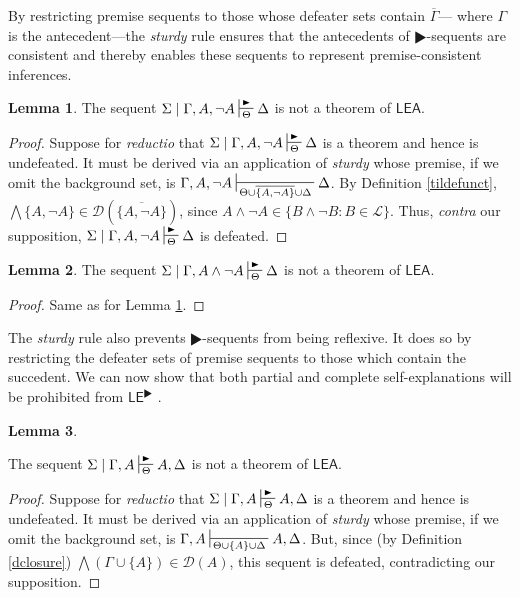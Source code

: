 \documentclass{article}
\theoremstyle{definition}
\theoremstyle{definition}
\theoremstyle{definition}
\newtheorem{lemma}{Lemma}
\theoremstyle{definition}
\theoremstyle{remark}
\theoremstyle{definition}
\theoremstyle{definition}
\begin{document}
By restricting premise sequents to those whose defeater sets contain $ \overline{\Gamma} $--- where $ \Gamma $ is the antecedent---the \textit{sturdy} rule ensures that the antecedents of $ \RHD $-sequents are consistent and thereby enables these sequents to represent premise-consistent inferences.

\begin{lemma}\label{inconsist}
	The sequent $ \Sigma\mid \Gamma, A, \neg A \sststile{\Theta}{\RHD}  \Delta $ is not a theorem of $ \mathsf{LEA}$.
	
	\begin{proof}
		Suppose for \textit{reductio} that $ \Sigma\mid \Gamma, A, \neg A \sststile{\Theta}{\RHD} \Delta $ is a theorem and hence is undefeated. It must be derived via an application of \textit{sturdy} whose premise, if we omit the background set, is $\Gamma, A, \neg A \sststile{\Theta\cup\overline{\{A, \neg A\}}\cup\Delta}{} \Delta $. By Definition \ref{tildefunct}, $\bigwedge\{A, \neg A \}\in \mathcal{D}(\overline{\{A, \neg A\}})$, since $ A \wedge \neg A \in  \{ B\wedge\neg B : B \in \mathcal{L} \}$. Thus, \textit{contra} our supposition,  $ \Sigma\mid \Gamma, A, \neg A \sststile{\Theta}{\RHD} \Delta $ is defeated.
	\end{proof}
\end{lemma}



\begin{lemma}\label{contradict}
	The sequent $ \Sigma\mid \Gamma, A \wedge \neg A \sststile{\Theta}{\RHD}  \Delta $ is not a theorem of $ \mathsf{LEA}$.
	
	\begin{proof} 
		Same as for Lemma \ref{inconsist}.
	\end{proof}
	
\end{lemma}




The \textit{sturdy} rule also prevents $ \RHD $-sequents from being reflexive. It does so by restricting the defeater sets of premise sequents to those which contain the succedent. We can now show that both partial and complete self-explanations will be prohibited from $ \mathsf{LE}^\RHD$ .

\begin{lemma}\label{irrefl}
	
	The sequent $ \Sigma\mid \Gamma, A \sststile{\Theta}{\RHD}  A, \Delta $ is not a theorem of $ \mathsf{LEA}$.
	
	\begin{proof}
		Suppose for \textit{reductio} that $ \Sigma\mid \Gamma, A \sststile{\Theta}{\RHD}  A, \Delta $ is a theorem and hence is undefeated. It must be derived via an application of \textit{sturdy} whose premise, if we omit the background set, is $ \Gamma, A \sststile{\Theta\cup\{A\}\cup\Delta}{}  A, \Delta $. But, since (by Definition \ref{dclosure}) $ \bigwedge(\Gamma\cup\{A\}) \in \mathcal{D}(A) $, this sequent is defeated, contradicting our supposition.  
	\end{proof}
\end{lemma}
\end{document}
